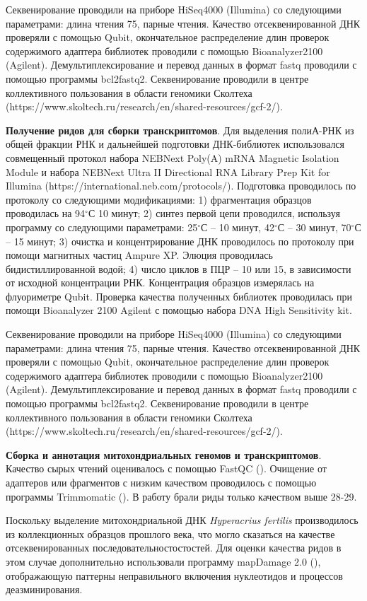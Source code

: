 Секвенирование проводили на приборе HiSeq4000 (Illumina) со следующими параметрами: длина чтения 75, парные чтения. Качество отсеквенированной ДНК проверяли с помощью Qubit, окончательное распределение длин проверок содержимого адаптера библиотек проводили с помощью Bioanalyzer2100 (Agilent). Демультиплексирование и перевод данных в формат fastq проводили с помощью программы bcl2fastq2. Секвенирование проводили в центре коллективного пользования в области геномики Сколтеха (https://www.skoltech.ru/research/en/shared-resources/gcf-2/).

\textbf{Получение ридов для сборки транскриптомов}. Для выделения полиА-РНК из общей фракции РНК и дальнейшей подготовки ДНК-библиотек использовался совмещенный протокол набора NEBNext Poly(A) mRNA Magnetic Isolation Module и набора NEBNext Ultra II Directional RNA Library Prep Kit for Illumina (https://international.neb.com/protocols/). Подготовка проводилось по протоколу со следующими модификациями: 
1) фрагментация образцов проводилась на 94$^\circ$С 10 минут; 
2) синтез первой цепи проводился, используя программу со следующими параметрами: 25$^\circ$С -- 10 минут, 42$^\circ$С -- 30 минут, 70$^\circ$С -- 15 минут; 
3) очистка и концентрирование ДНК проводилось по протоколу при помощи магнитных частиц Ampure XP. Элюция проводилась бидистиллированной водой; 
4) число циклов в ПЦР -- 10 или 15, в зависимости от исходной концентрации РНК. 
Концентрация образцов измерялась на флуориметре Qubit. Проверка качества полученных библиотек проводилась при помощи Bioanalyzer 2100 Agilent с помощью набора DNA High Sensitivity kit. 

Секвенирование проводили на приборе HiSeq4000 (Illumina) со следующими параметрами: длина чтения 75, парные чтения. Качество отсеквенированной ДНК проверяли с помощью Qubit, окончательное распределение длин проверок содержимого адаптера библиотек проводили с помощью Bioanalyzer2100 (Agilent). Демультиплексирование и перевод данных в формат fastq проводили с помощью программы bcl2fastq2. Секвенирование проводили в центре коллективного пользования в области геномики Сколтеха (https://www.skoltech.ru/research/en/shared-resources/gcf-2/).

\textbf{Сборка и аннотация митохондриальных геномов и транскриптомов}. Качество сырых чтений оценивалось с помощью FastQC (\cite{Andrews2010}). Очищение от адаптеров или фрагментов с низким качеством проводилось с помощью программы Trimmomatic (\cite{Bolger2014}). В работу брали риды только качеством выше 28-29.

Поскольку выделение митохондриальной ДНК \textit{Hyperacrius fertilis} производилось из коллекционных образцов прошлого века, что могло сказаться на качестве отсеквенированных последовательностостостей. Для оценки качества ридов в этом случае дополнительно использовали программу mapDamage 2.0 (\cite{Jonsson2013}), отображающую паттерны неправильного включения нуклеотидов и процессов деазминирования. 

